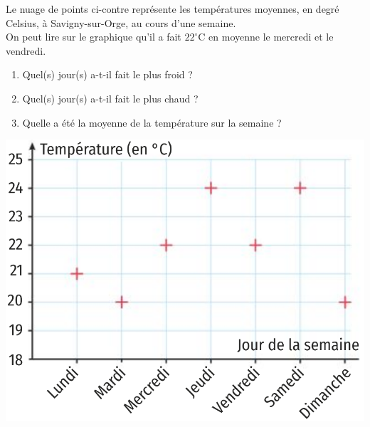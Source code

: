 \documentclass[11pt]{article}
\begin{document}
\begin{exemple}
  \begin{minipage}{.5\textwidth}
    Le nuage de points ci-contre représente les températures moyennes, en degré
    Celsius, à Savigny-sur-Orge, au cours d'une semaine.\\
    On peut lire sur le graphique qu'il a fait $22^\circ$C en moyenne le
    mercredi et le vendredi.
    \begin{enumerate}
      \item Quel(s) jour(s) a-t-il fait le plus froid ?
      \item Quel(s) jour(s) a-t-il fait le plus chaud ?
      \item Quelle a été la moyenne de la température sur la semaine ?
    \end{enumerate}
  \end{minipage}
  \begin{minipage}{.5\textwidth}
\begin{center}
  \includegraphics[scale=.25]{nuage1.png}
\end{center}
  \end{minipage}
\end{exemple}
\end{document}
